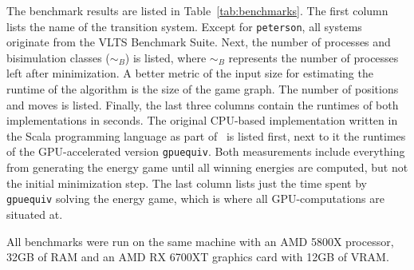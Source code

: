 The benchmark results are listed in Table~\ref{tab:benchmarks}.
The first column lists the name of the transition system.
Except for \texttt{peterson}, all systems originate from the VLTS Benchmark
Suite.
Next, the number of processes and bisimulation classes ($\sim_B$) is listed,
where $\sim_B$ represents the number of processes left after minimization.
A better metric of the input size for estimating the runtime of the algorithm
is the size of the game graph.
The number of positions and moves is listed.
Finally, the last three columns contain the runtimes of both implementations in
seconds.
The original CPU-based implementation written in the Scala programming
language as part of~\cite{bisping2023process} is listed first,
next to it the runtimes of the GPU-accelerated version \texttt{gpuequiv}.
Both measurements include everything from generating the energy game until
all winning energies are computed, but not the initial minimization step.
The last column lists just the time spent by \texttt{gpuequiv} solving the
energy game, which is where all GPU-computations are situated at.

All benchmarks were run on the same machine with an AMD 5800X processor,
32GB of RAM and an AMD RX 6700XT graphics card with 12GB of VRAM\@.

